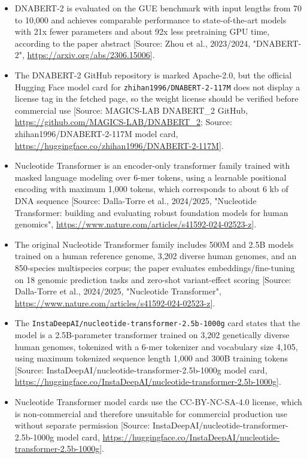 \documentclass[11pt]{report}
\begin{document}
\begin{itemize}
\item DNABERT-2 is evaluated on the GUE benchmark with input lengths from 70 to 10,000 and achieves comparable performance to state-of-the-art models with 21x fewer parameters and about 92x less pretraining GPU time, according to the paper abstract [Source: Zhou et al., 2023/2024, "DNABERT-2", \url{https://arxiv.org/abs/2306.15006}].
\item The DNABERT-2 GitHub repository is marked Apache-2.0, but the official Hugging Face model card for \texttt{zhihan1996/DNABERT-2-117M} does not display a license tag in the fetched page, so the weight license should be verified before commercial use [Source: MAGICS-LAB DNABERT\_2 GitHub, \url{https://github.com/MAGICS-LAB/DNABERT_2}; Source: zhihan1996/DNABERT-2-117M model card, \url{https://huggingface.co/zhihan1996/DNABERT-2-117M}].
\item Nucleotide Transformer is an encoder-only transformer family trained with masked language modeling over 6-mer tokens, using a learnable positional encoding with maximum 1,000 tokens, which corresponds to about 6 kb of DNA sequence [Source: Dalla-Torre et al., 2024/2025, "Nucleotide Transformer: building and evaluating robust foundation models for human genomics", \url{https://www.nature.com/articles/s41592-024-02523-z}].
\item The original Nucleotide Transformer family includes 500M and 2.5B models trained on a human reference genome, 3,202 diverse human genomes, and an 850-species multispecies corpus; the paper evaluates embeddings/fine-tuning on 18 genomic prediction tasks and zero-shot variant-effect scoring [Source: Dalla-Torre et al., 2024/2025, "Nucleotide Transformer", \url{https://www.nature.com/articles/s41592-024-02523-z}].
\item The \texttt{InstaDeepAI/nucleotide-transformer-2.5b-1000g} card states that the model is a 2.5B-parameter transformer trained on 3,202 genetically diverse human genomes, tokenized with a 6-mer tokenizer and vocabulary size 4,105, using maximum tokenized sequence length 1,000 and 300B training tokens [Source: InstaDeepAI/nucleotide-transformer-2.5b-1000g model card, \url{https://huggingface.co/InstaDeepAI/nucleotide-transformer-2.5b-1000g}].
\item Nucleotide Transformer model cards use the CC-BY-NC-SA-4.0 license, which is non-commercial and therefore unsuitable for commercial production use without separate permission [Source: InstaDeepAI/nucleotide-transformer-2.5b-1000g model card, \url{https://huggingface.co/InstaDeepAI/nucleotide-transformer-2.5b-1000g}].

\end{itemize}
\end{document}
